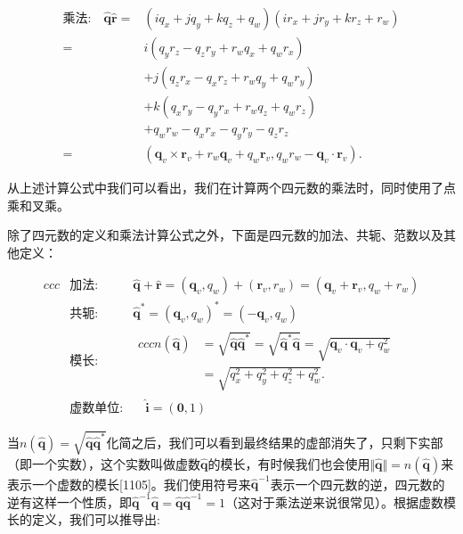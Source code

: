 \documentclass[
  paper=a4,
  ,captions=tableheading
]{scrartcl}
\begin{document}
\[
  \begin{aligned}  \textbf{乘法:} \quad \hat{\mathbf{q}} \hat{\mathbf{r}}=&\left(i q_{x}+j q_{y}+k q_{z}+q_{w}\right)\left(i r_{x}+j r_{y}+k r_{z}+r_{w}\right) \\=& i\left(q_{y} r_{z}-q_{z} r_{y}+r_{w} q_{x}+q_{w} r_{x}\right) \\ &+j\left(q_{z} r_{x}-q_{x} r_{z}+r_{w} q_{y}+q_{w} r_{y}\right) \\ &+k\left(q_{x} r_{y}-q_{y} r_{x}+r_{w} q_{z}+q_{w} r_{z}\right) \\ &+q_{w} r_{w}-q_{x} r_{x}-q_{y} r_{y}-q_{z} r_{z} \\=&\left(\mathbf{q}_{v} \times \mathbf{r}_{v}+r_{w} \mathbf{q}_{v}+q_{w} \mathbf{r}_{v}, q_{w} r_{w}-\mathbf{q}_{v} \cdot \mathbf{r}_{v}\right) . \end{aligned}
  \tag{4.32}
\]

从上述计算公式中我们可以看出，我们在计算两个四元数的乘法时，同时使用了点乘和叉乘。

除了四元数的定义和乘法计算公式之外，下面是四元数的加法、共轭、范数以及其他定义：

\[
  \begin{aligned}{ccc}
     & \textbf{加法} :  & \hat{\mathbf{q}}+\hat{\mathbf{r}}=(\mathbf{q}_{v}, q_{w})+(\mathbf{r}_{v}, r_{w})=(\mathbf{q}_{v}+\mathbf{r}_{v}, q_{w}+r_{w})                                                                                                         \\[5mm]
     & \textbf{共轭} :  & \hat{\mathbf{q}}^{*}=\left(\mathbf{q}_{v}, q_{w}\right)^{*}=\left(-\mathbf{q}_{v}, q_{w}\right)                                                                                                                                        \\[5mm]
     & \textbf{模长}:   &
    \begin{aligned}{ccc}
      n(\hat{\mathbf{q}}) & =\sqrt{\hat{\mathbf{q}} \hat{\mathbf{q}}^{*}}=\sqrt{\hat{\mathbf{q}}^{*} \hat{\mathbf{q}}}=\sqrt{\mathbf{q}_{v} \cdot \mathbf{q}_{v}+q_{w}^{2}} \\&=\sqrt{q_{x}^{2}+q_{y}^{2}+q_{z}^{2}+q_{w}^{2}} .
    \end{aligned} \\[5mm]
     & \textbf{虚数单位}: & \quad \hat{\mathbf{i}}=(\mathbf{0}, 1)
  \end{aligned}
  \tag{4.33}
\]

当\(n(\hat{\mathbf{q}}) =\sqrt{\hat{\mathbf{q}} \hat{\mathbf{q}}^{*}}\)化简之后，我们可以看到最终结果的虚部消失了，只剩下实部（即一个实数），这个实数叫做虚数\(\mathbf{\hat{q}}\)的模长，有时候我们也会使用\(\Vert \hat{\mathbf{q}} \Vert = n(\hat{\mathbf{q}})\)来表示一个虚数的模长{[}1105{]}。我们使用符号来\(\hat{\mathbf{q}}^{-1}\)表示一个四元数的逆，四元数的逆有这样一个性质，即\(\hat{\mathbf{q}}^{-1} \hat{\mathbf{q}} = \hat{\mathbf{q}} \hat{\mathbf{q}}^{-1} =1\)（这对于乘法逆来说很常见）。根据虚数模长的定义，我们可以推导出:
\end{document}
